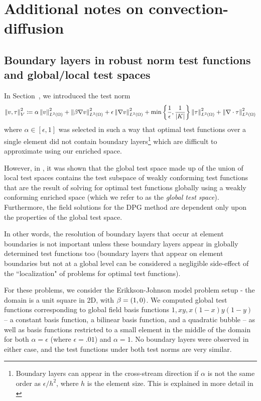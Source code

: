 \chapter{Additional notes on convection-diffusion}

\section{Boundary layers in robust norm test functions and global/local test spaces}

In Section~, we introduced the test norm
\[
\nor{v,\tau}_V^2 \coloneqq \alpha\nor{v}_{\L}^2 + \nor{\beta\grad v}_{\L}^2 + \epsilon \nor{\grad v}_{\L}^2 + {\min}\LRc{\frac{1}{\epsilon},\frac{1}{\LRb{K}}}\nor{\tau}_{\L}^2 + \nor{\div \tau}_{\L}^2
\]
where $\alpha \in [\epsilon,1]$ was selected in such a way that optimal test functions over a single element did not contain boundary layers\footnote{Boundary layers can appear in the cross-stream direction if $\alpha$ is not the same order as $\epsilon/h^2$, where $h$ is the element size.  This is explained in more detail in \cite{DPGrobustness2}} which are difficult to approximate using our enriched space.  

However, in \cite{globalLocalDPG}, it was shown that the global test space made up of the union of local test spaces contains the test subspace of weakly conforming test functions that are the result of solving for optimal test functions globally using a weakly conforming enriched space (which we refer to as the \textit{global test space}).  Furthermore, the field solutions for the DPG method are dependent only upon the properties of the global test space.  

In other words, the resolution of boundary layers that occur at element boundaries is not important unless these boundary layers appear in globally determined test functions too (boundary layers that appear on element boundaries but not at a global level can be considered a negligible side-effect of the ``localization" of problems for optimal test functions).  

For these problems, we consider the Erikkson-Johnson model problem setup - the domain is a unit square in 2D, with $\beta = \LRp{1,0}$.  We computed global test functions corresponding to global field basis functions $1, xy, x(1-x)y(1-y)$ -- a constant basis function, a bilinear basis function, and a quadratic bubble -- as well as basis functions restricted to a small element in the middle of the domain for both $\alpha = \epsilon$ (where $\epsilon = .01$) and $\alpha = 1$.  No boundary layers were observed in either case, and the test functions under both test norms are very similar. 

